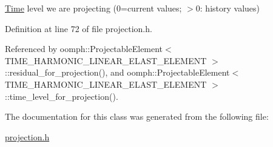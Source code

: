\hyperlink{classoomph_1_1Time}{Time} level we are projecting (0=current values; $>$0\+: history values) 



Definition at line 72 of file projection.\+h.



Referenced by oomph\+::\+Projectable\+Element$<$ T\+I\+M\+E\+\_\+\+H\+A\+R\+M\+O\+N\+I\+C\+\_\+\+L\+I\+N\+E\+A\+R\+\_\+\+E\+L\+A\+S\+T\+\_\+\+E\+L\+E\+M\+E\+N\+T $>$\+::residual\+\_\+for\+\_\+projection(), and oomph\+::\+Projectable\+Element$<$ T\+I\+M\+E\+\_\+\+H\+A\+R\+M\+O\+N\+I\+C\+\_\+\+L\+I\+N\+E\+A\+R\+\_\+\+E\+L\+A\+S\+T\+\_\+\+E\+L\+E\+M\+E\+N\+T $>$\+::time\+\_\+level\+\_\+for\+\_\+projection().



The documentation for this class was generated from the following file\+:\begin{DoxyCompactItemize}
\item 
\hyperlink{projection_8h}{projection.\+h}\end{DoxyCompactItemize}
